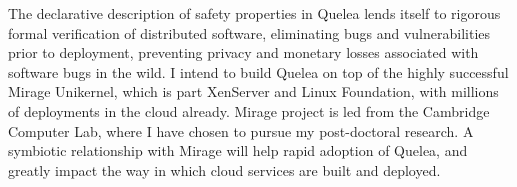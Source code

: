 \documentclass[screen,acmsmall,nonacm]{acmart}
\begin{document}
The declarative description of safety properties in Quelea lends itself to
rigorous formal verification of distributed software, eliminating bugs and
vulnerabilities prior to deployment, preventing privacy and monetary losses
associated with software bugs in the wild. I intend to build Quelea on top of
the highly successful Mirage Unikernel, which is part XenServer and Linux
Foundation, with millions of deployments in the cloud already. Mirage project
is led from the Cambridge Computer Lab, where I have chosen to pursue my
post-doctoral research. A symbiotic relationship with Mirage will help rapid
adoption of Quelea, and greatly impact the way in which cloud services are
built and deployed.




\end{document}
